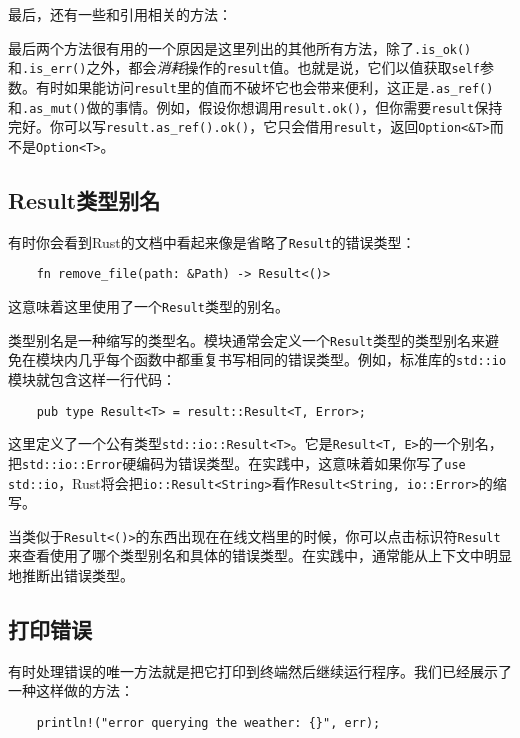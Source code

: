 
最后，还有一些和引用相关的方法：


最后两个方法很有用的一个原因是这里列出的其他所有方法，除了\texttt{.is\_ok()}和\texttt{.is\_err()}之外，都会\emph{消耗}操作的\texttt{result}值。也就是说，它们以值获取\texttt{self}参数。有时如果能访问\texttt{result}里的值而不破坏它也会带来便利，这正是\texttt{.as\_ref()}和\texttt{.as\_mut()}做的事情。例如，假设你想调用\texttt{result.ok()}，但你需要\texttt{result}保持完好。你可以写\texttt{result.as\_ref().ok()}，它只会借用\texttt{result}，返回\texttt{Option<\&T>}而不是\texttt{Option<T>}。

\subsection{Result类型别名}
有时你会看到Rust的文档中看起来像是省略了\texttt{Result}的错误类型：
\begin{verbatim}
    fn remove_file(path: &Path) -> Result<()>
\end{verbatim}
这意味着这里使用了一个\texttt{Result}类型的别名。

类型别名是一种缩写的类型名。模块通常会定义一个\texttt{Result}类型的类型别名来避免在模块内几乎每个函数中都重复书写相同的错误类型。例如，标准库的\texttt{std::io}模块就包含这样一行代码：
\begin{verbatim}
    pub type Result<T> = result::Result<T, Error>;
\end{verbatim}

这里定义了一个公有类型\texttt{std::io::Result<T>}。它是\texttt{Result<T, E>}的一个别名，把\texttt{std::io::Error}硬编码为错误类型。在实践中，这意味着如果你写了\texttt{use std::io}，Rust将会把\texttt{io::Result<String>}看作\texttt{Result<String, io::Error>}的缩写。

当类似于\texttt{Result<()>}的东西出现在在线文档里的时候，你可以点击标识符\texttt{Result}来查看使用了哪个类型别名和具体的错误类型。在实践中，通常能从上下文中明显地推断出错误类型。

\subsection{打印错误}\label{printerror}
有时处理错误的唯一方法就是把它打印到终端然后继续运行程序。我们已经展示了一种这样做的方法：
\begin{verbatim}
    println!("error querying the weather: {}", err);
\end{verbatim}

